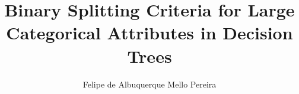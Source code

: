 \documentclass[msc,british,bibkey]{ThesisPUC_uk}
\author{\mbox{Felipe} \mbox{de} \mbox{Albuquerque} \mbox{Mello} \mbox{Pereira}}
\title{Binary Splitting Criteria for Large Categorical Attributes in Decision Trees}
\begin{document}
\newcommand{\remove}[1]{}
\newcommand{\dist}[3]{d(#1, #2)}
\newcommand{\distC}[2]{d(#1, #2)}
\newcommand{\OPT}[1]{\textrm{OPT}(#1)}
\newcommand{\OPTf}[2]{\textrm{OPT}(#1, #2)}
\newcommand{\Cf}[2]{\textrm{cost}(#1, #2)}
\newcommand{\C}[1]{\textrm{cost}(#1)}
\newcommand{\ans}[1]{\textbf{#1}}
\newcommand{\bl}{\textrm{blocked}}
\newcommand{\un}{\textrm{unassigned}}
\newcommand{\comments}[1]{}
\newcommand{\commento}[1]{\marginpar{\tiny \flushleft{#1}}}
\newtheorem{lemma}{Lemma}
\newtheorem{definition}{Definition}[section]








\begin{raggedright}
	
\end{raggedright}
\end{document}
